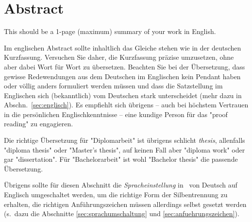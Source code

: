 \chapter{Abstract}

\begin{english} %
This should be a 1-page (maximum) summary of your work in English.
\end{english}

Im englischen Abstract sollte inhaltlich das Gleiche stehen wie in der
deutschen Kurzfassung. Versuchen Sie daher, die Kurzfassung prä\-zise
umzusetzen, ohne aber dabei Wort für Wort zu übersetzen. Beachten Sie bei der
Übersetzung, dass gewisse Redewendungen aus dem Deutschen im Englischen kein
Pendant haben oder völlig anders formuliert werden müssen und dass die
Satzstellung im Englischen sich (bekanntlich) vom Deutschen stark unterscheidet
(mehr dazu in Abschn.\ \ref{sec:englisch}). Es empfiehlt sich übrigens --
auch bei höchstem Vertrauen in die persönlichen Englischkenntnisse -- eine
kundige Person für das "proof reading" zu engagieren.

Die richtige Übersetzung für "Diplomarbeit" ist übrigens schlicht
\emph{thesis}, allenfalls  "diploma thesis" oder "Master's thesis", auf
keinen Fall aber "diploma work" oder gar "dissertation". Für "Bachelorarbeit"
ist wohl "Bachelor thesis" die passende Übersetzung.

Übrigens sollte für diesen Abschnitt die \emph{Spracheinstellung} in \latex\
von Deutsch auf Englisch umgeschaltet werden, um die richtige Form der
Silbentrennung zu erhalten, die richtigen Anführungszeichen müssen allerdings
selbst gesetzt werden (s.\ dazu die Abschnitte \ref{sec:sprachumschaltung}
und \ref{sec:anfuehrungszeichen}).
